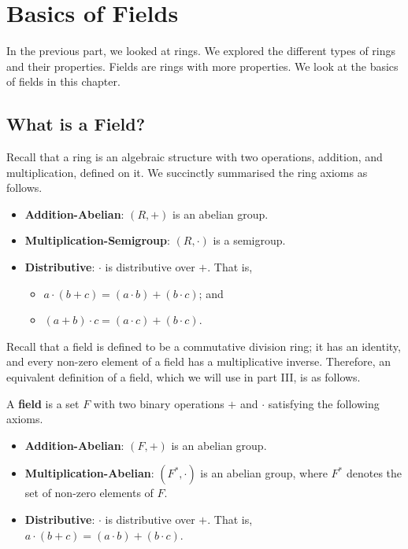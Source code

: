 \chapter{Basics of Fields}
In the previous part, we looked at rings. We explored the different types of rings and their properties. Fields are rings with more properties. We look at the basics of fields in this chapter.

\section{What is a Field?}
Recall that a ring is an algebraic structure with two operations, addition, and multiplication, defined on it. We succinctly summarised the ring axioms as follows.
\begin{itemize}
    \item \textbf{Addition-Abelian}: $(R, +)$ is an abelian group.
    \item \textbf{Multiplication-Semigroup}: $(R, \cdot)$ is a semigroup.
    \item \textbf{Distributive}: $\cdot$ is distributive over $+$. That is,
    \begin{itemize}
        \item $a \cdot (b + c) = (a \cdot b) + (b \cdot c)$; and
        \item $(a + b) \cdot c = (a \cdot c) + (b \cdot c)$.
    \end{itemize}
\end{itemize}

Recall that a field is defined to be a commutative division ring; it has an identity, and every non-zero element of a field has a multiplicative inverse. Therefore, an equivalent definition of a field, which we will use in part III, is as follows.
\begin{definition}
    A \textbf{field} is a set $F$ with two binary operations $+$ and $\cdot$ satisfying the following axioms.
    \begin{itemize}
        \item \textbf{Addition-Abelian}: $(F, +)$ is an abelian group.
        \item \textbf{Multiplication-Abelian}: $(F^\ast, \cdot)$ is an abelian group, where $F^\ast$ denotes the set of non-zero elements of $F$.
        \item \textbf{Distributive}: $\cdot$ is distributive over $+$. That is, $a \cdot (b + c) = (a \cdot b) + (b \cdot c)$.
    \end{itemize}
\end{definition}

